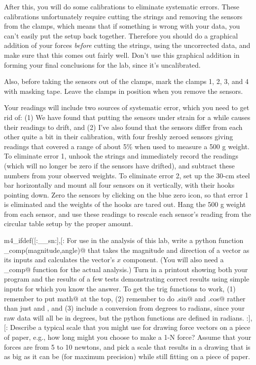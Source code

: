 After this, you will do some calibrations to eliminate systematic errors. These calibrations
unfortunately require cutting the strings and removing the sensors from the clamps,
which means that if something is wrong with your
data, you can't easily put the setup back together. Therefore you should do a graphical
addition of your forces \emph{before} cutting the strings, using the uncorrected data,
and make sure that this comes out fairly well. Don't use this graphical addition in forming
your final conclusions for the lab, since it's uncalibrated.

Also, before taking the sensors out of the clamps,
mark the clamps 1, 2, 3, and 4 with masking tape. Leave the clamps in position when you remove the
sensors.

Your readings will include two sources of systematic error, which you need
to get rid of: (1) We have found that putting the
sensors under strain for a while causes their readings to drift, and (2)
I've also found that the sensors differ from each other quite a bit in their
calibration, with four freshly zeroed sensors giving readings
that covered a range of about 5\% when used to measure a 500 g weight.
To eliminate error 1, unhook the strings and immediately record the readings (which
will no longer be zero if the sensors have drifted), and subtract these
numbers from your observed weights. To eliminate error 2, set up the 30-cm steel bar
horizontally and mount all four sensors on it vertically, with their hooks pointing down.
Zero the sensors by clicking on the blue zero icon, so that error 1 is eliminated and the weights of the hooks are tared out.
Hang the 500 g weight from each sensor, and use these readings to
rescale each sensor's reading from the circular table setup by the proper amount.


\prelab

m4_ifdef([:__sn:],[:%
\prelabquestion For use in the analysis of this lab, write a python function \verb@x_comp(magnitude,angle)@ that
takes the magnitude and direction of a vector as its inputs and calculates the vector's $x$ component.
(You will also need a \verb@y_comp@ function for the actual analysis.)
Turn in a printout showing both your program and the results of a few tests demonstrating correct results
using simple inputs for which you know the answer.
To get the trig functions to work, (1) remember to put \verb@import math@ at the top, (2) remember to do \verb@math.sin@
and \verb@math.cos@ rather than just \verb@sin@ and \verb@cos@, and (3) include a conversion from degrees to radians, since
your raw data will all be in degrees, but the python functions are defined in radians.
:],[:%
\prelabquestion  Describe a typical scale that you might use for drawing
force vectors on a piece of paper, e.g., how long might you
choose to make a 1-N force?  Assume that your forces are
from 5 to 10 newtons, and pick a scale that results in a drawing that
is as big as it can be (for maximum precision) while still fitting on
a piece of paper.

